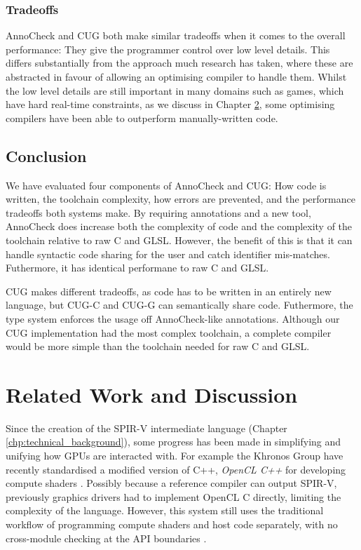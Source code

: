 \documentclass[a4paper,12pt,twoside,openright]{report}
\begin{document}
\subsection{Tradeoffs}

\label{sec:performance_tradeoffs}

AnnoCheck and CUG both make similar tradeoffs when it comes to the overall
performance: They give the programmer control over low level details. This
differs substantially from the approach much research has taken, where these
are abstracted in favour of allowing an optimising compiler to handle them.
Whilst the low level details are still important in many domains such as games,
which have hard real-time constraints, as we discuss in Chapter
\ref{chp:related_work}, some optimising compilers have been able to outperform
manually-written code.

\section{Conclusion}

We have evaluated four components of AnnoCheck and CUG: How code is written,
the toolchain complexity, how errors are prevented, and the performance
tradeoffs both systems make. By requiring annotations and a new tool, AnnoCheck
does increase both the complexity of code and the complexity of the toolchain
relative to raw C and GLSL. However, the benefit of this is that it can handle
syntactic code sharing for the user and catch identifier mis-matches.
Futhermore, it has identical performane to raw C and GLSL.

CUG makes different tradeoffs, as code has to be written in an entirely new
language, but CUG-C and CUG-G can semantically share code. Futhermore, the type
system enforces the usage off AnnoCheck-like annotations. Although our CUG
implementation had the most complex toolchain, a complete compiler would be
more simple than the toolchain needed for raw C and GLSL.

\chapter{Related Work and Discussion}

\label{chp:related_work}

Since the creation of the SPIR-V intermediate language (Chapter
\ref{chp:technical_background}), some progress has been made in simplifying and
unifying how GPUs are interacted with. For example the Khronos Group have
recently standardised a modified version of C++, \textit{OpenCL C++} for
developing compute shaders \cite{OpenCL22Release} \cite{OpenCLCPPWhitePaper}
\cite{OpenCL}. Possibly because a reference compiler can output SPIR-V,
previously graphics drivers had to implement OpenCL C directly, limiting the
complexity of the language. However, this system still uses the traditional
workflow of programming compute shaders and host code separately, with no
cross-module checking at the API boundaries \cite{OpenCL22Release}.
\end{document}
